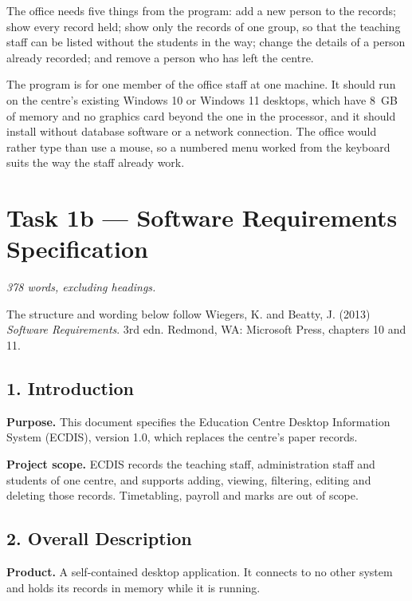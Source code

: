 \documentclass[11pt,a4paper]{article}
\begin{document}
The office needs five things from the program: add a new person to the records;
show every record held; show only the records of one group, so that the teaching
staff can be listed without the students in the way; change the details of a
person already recorded; and remove a person who has left the centre.

The program is for one member of the office staff at one machine. It should run
on the centre's existing Windows 10 or Windows 11 desktops, which have 8~GB of
memory and no graphics card beyond the one in the processor, and it should
install without database software or a network connection. The office would
rather type than use a mouse, so a numbered menu worked from the keyboard suits
the way the staff already work.

\section*{Task 1b --- Software Requirements Specification}

\textit{378 words, excluding headings.}

{\footnotesize The structure and wording below follow Wiegers, K. and Beatty, J.
(2013) \textit{Software Requirements}. 3rd edn. Redmond, WA: Microsoft Press,
chapters 10 and 11.}

\subsection*{1. Introduction}

\textbf{Purpose.} This document specifies the Education Centre Desktop
Information System (ECDIS), version 1.0, which replaces the centre's paper
records.

\textbf{Project scope.} ECDIS records the teaching staff, administration staff
and students of one centre, and supports adding, viewing, filtering, editing and
deleting those records. Timetabling, payroll and marks are out of scope.

\subsection*{2. Overall Description}

\textbf{Product.} A self-contained desktop application. It connects to no other
system and holds its records in memory while it is running.
\end{document}

